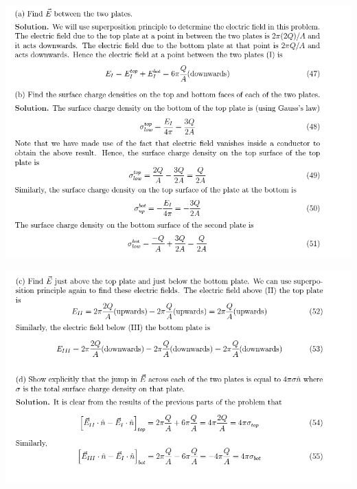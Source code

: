 \documentclass[makesolutionspdf]{esg8022pset}
\begin{document}
\begin{solution}
  \begin{center}\includegraphics[width=\textwidth]{ps07_sol_08_1}\end{center}
  \begin{center}\includegraphics[width=\textwidth]{ps07_sol_08_2}\end{center}
\end{solution}
\end{document}
